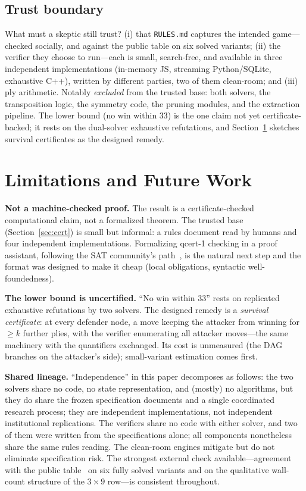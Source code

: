 \documentclass[conference]{IEEEtran}
\begin{document}
\subsection{Trust boundary}

What must a skeptic still trust? (i) that \texttt{RULES.md} captures the intended game---checked socially, and against the public table on six solved variants; (ii) the verifier they choose to run---each is small, search-free, and available in three independent implementations (in-memory JS, streaming Python/SQLite, exhaustive C++), written by different parties, two of them clean-room; and (iii) ply arithmetic. Notably \emph{excluded} from the trusted base: both solvers, the transposition logic, the symmetry code, the pruning modules, and the extraction pipeline. The lower bound (no win within 33) is the one claim not yet certificate-backed; it rests on the dual-solver exhaustive refutations, and Section~\ref{sec:limits} sketches survival certificates as the designed remedy.

\section{Limitations and Future Work}
\label{sec:limits}

\textbf{Not a machine-checked proof.} The result is a certificate-checked computational claim, not a formalized theorem. The trusted base (Section~\ref{sec:cert}) is small but informal: a rules document read by humans and four independent implementations. Formalizing \textsf{qcert-1} checking in a proof assistant, following the SAT community's path~\cite{tan2021cakelpr}, is the natural next step and the format was designed to make it cheap (local obligations, syntactic well-foundedness).

\textbf{The lower bound is uncertified.} ``No win within 33'' rests on replicated exhaustive refutations by two solvers. The designed remedy is a \emph{survival certificate}: at every defender node, a move keeping the attacker from winning for $\geq k$ further plies, with the verifier enumerating all attacker moves---the same machinery with the quantifiers exchanged. Its cost is unmeasured (the DAG branches on the attacker's side); small-variant estimation comes first.

\textbf{Shared lineage.} ``Independence'' in this paper decomposes as follows: the two solvers share no code, no state representation, and (mostly) no algorithms, but they do share the frozen specification documents and a single coordinated research process; they are independent implementations, not independent institutional replications. The verifiers share no code with either solver, and two of them were written from the specifications alone; all components nonetheless share the same rules reading. The clean-room engines mitigate but do not eliminate specification risk. The strongest external check available---agreement with the public table~\cite{slatton2026solving} on six fully solved variants and on the qualitative wall-count structure of the $3\times 9$ row---is consistent throughout.
\end{document}
